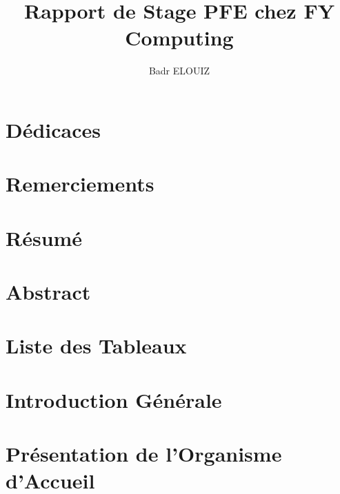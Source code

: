 \documentclass[a4paper,11pt,oneside]{report}
\author{Badr ELOUIZ}
\title{Rapport de Stage PFE chez FY Computing}
\begin{document}
\sloppy

\makeatletter



\makeatother

\newpage

\newpage

\chapter*{Dédicaces}

\newpage

\chapter*{Remerciements}

\newpage

\chapter*{Résumé}

\newpage

\chapter*{Abstract}

\newpage

\tableofcontents

\newpage

\listoffigures

\newpage

\chapter*{Liste des Tableaux}

\newpage

\chapter*{Introduction Générale}



\newpage

\chapter{Présentation de l'Organisme d'Accueil}

\newpage


\end{document}
